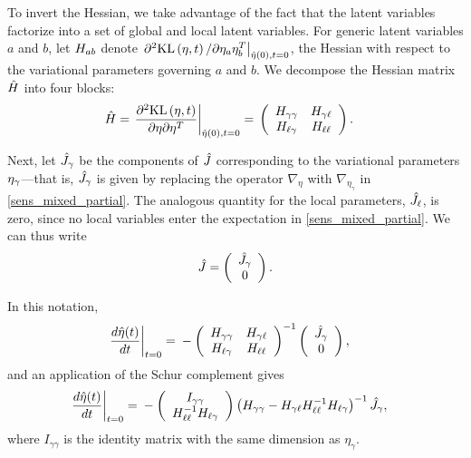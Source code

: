 To invert the Hessian, we take advantage of the fact that the latent variables
factorize into a set of global and local latent variables.
For generic latent variables $a$ and $b$,
let $H_{ab}$ denote $\left.\partial^2 \mathrm{KL}\left(\eta, t\right) / \partial \eta_a
\eta_b^T\right|_{\hat\eta(0), t=0}$, the Hessian with respect to the variational
parameters governing $a$ and $b$.
We decompose the Hessian matrix $\hat{H}$ into four blocks:
%
\begin{align*}
%
\hessopt =
\fracat{\partial^2 \KL{\eta, \t}}
       {\partial \eta \partial \eta^T}
       {\etaopt(0), t= 0} ={}&
\left(
\begin{array}{cc}
   \hess{\gamma\gamma} & \hess{\gamma\ell} \\
   \hess{\ell\gamma}     & \hess{\ell\ell} \\
\end{array}
\right).
%
\end{align*}

Next, let $\hat J_\gamma$ be the components of
$\hat J$ corresponding to the variational parameters
$\eta_{\gamma}$---that is, $\hat J_\gamma$ is given by replacing
the operator $\nabla_\eta$ with $\nabla_{\eta_\gamma}$ in \eqref{sens_mixed_partial}.
The analogous quantity for the local parameters, $\hat J_\ell$,
is zero, since no local variables enter the expectation in \eqref{sens_mixed_partial}.
We can thus write
\begin{align*}
  \hat J = \left( \begin{array}{c} \hat J_\gamma \\ 0 \end{array}\right).
\end{align*}

In this notation,
%
\begin{align*}
%
\fracat{d \etaopt(\t)}{d \t}{t = 0} ={}&
-\left(
\begin{array}{cc}
   \hess{\gamma\gamma} & \hess{\gamma\ell} \\
   \hess{\ell\gamma}     & \hess{\ell\ell} \\
\end{array}
\right)^{-1}
\left( \begin{array}{c} \crosshessian_\gamma \\ 0 \end{array}\right),
%
\end{align*}
%
and an application of the Schur complement gives
%
\begin{align*}
%
\fracat{d \etaopt(\t)}{d \t}{t = 0} ={}&
-\left(\begin{array}{c}
I_{\gamma\gamma} \\
\hess{\ell\ell}^{-1} \hess{\ell\gamma}
\end{array}\right)
\left(\hess{\gamma\gamma} -
      \hess{\gamma\ell} \hess{\ell\ell}^{-1} \hess{\ell\gamma}\right)^{-1} \crosshessian_\gamma,
%
\end{align*}
where $I_{\gamma\gamma}$ is the identity matrix with
the same dimension as $\eta_\gamma$.

